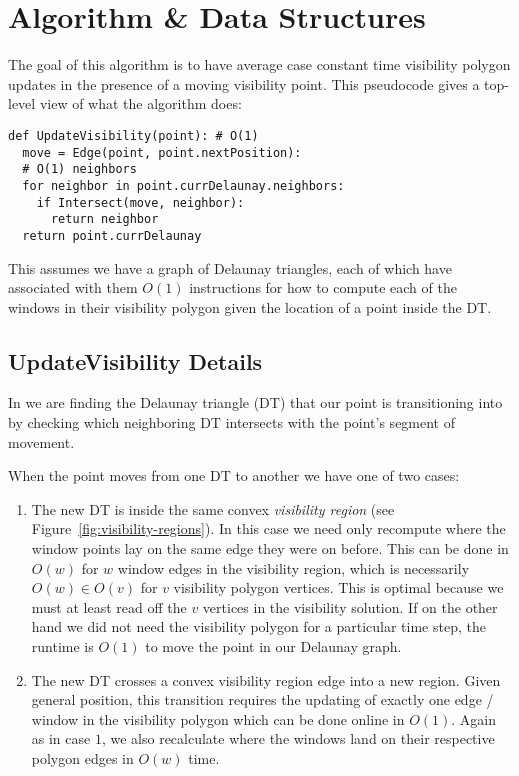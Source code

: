 \section{Algorithm \& Data Structures} \label{sec:algorithm}

The goal of this algorithm is to have average case constant time
visibility polygon updates in the presence of a moving visibility point. This
 pseudocode gives a top-level view of what the
algorithm does:

\begin{verbatim}
def UpdateVisibility(point): # O(1)
  move = Edge(point, point.nextPosition):
  # O(1) neighbors
  for neighbor in point.currDelaunay.neighbors:
    if Intersect(move, neighbor):
      return neighbor
  return point.currDelaunay
\end{verbatim}

This assumes we have a graph of Delaunay triangles, each of which have
associated with them $O(1)$ instructions for how to compute each of the
windows in their visibility polygon given the location of a point inside
the DT.

\subsection{UpdateVisibility Details}

In  we are finding the Delaunay triangle (DT) that our
point is transitioning into by checking which neighboring DT
intersects with the point's segment of movement.

When the point moves from one DT to another we have one of two cases:

\begin{enumerate}
  \item The new DT is inside the same convex \emph{visibility region}
    (see Figure~\ref{fig:visibility-regions}). In this
    case we need only recompute where the window points lay on the same
    edge they were on before. This can be done in $O(w)$ for $w$ window
    edges in the visibility region, which is necessarily $O(w) \in O(v)$
    for $v$ visibility polygon vertices. This is optimal because we must
    at least read off the $v$ vertices in the visibility solution. If on
    the other hand we did not need the visibility polygon for a particular
    time step, the runtime is $O(1)$ to move the point in our Delaunay
    graph.
  \item The new DT crosses a convex visibility region edge into a new
    region. Given general position, this transition requires the
    updating of exactly one edge / window in the visibility polygon
    which can be done online in $O(1)$. Again as in case $1$, we also
    recalculate where the windows land on their respective polygon
    edges in $O(w)$ time.
\end{enumerate}

